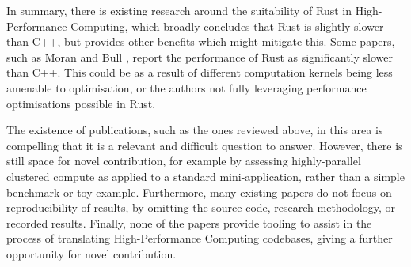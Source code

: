 In summary, there is existing research around the suitability of Rust in High-Performance Computing, which broadly concludes that Rust is slightly slower than C++, but provides other benefits which might mitigate this. Some papers, such as Moran and Bull \cite{moranEmergingTechnologiesRust2023}, report the performance of Rust as significantly slower than C++. This could be as a result of different computation kernels being less amenable to optimisation, or the authors not fully leveraging performance optimisations possible in Rust.

The existence of publications, such as the ones reviewed above, in this area is compelling that it is a relevant and difficult question to answer. However, there is still space for novel contribution, for example by assessing highly-parallel clustered compute as applied to a standard mini-application, rather than a simple benchmark or toy example. Furthermore, many existing papers do not focus on reproducibility of results, by omitting the source code, research methodology, or recorded results. Finally, none of the papers provide tooling to assist in the process of translating High-Performance Computing codebases, giving a further opportunity for novel contribution.
